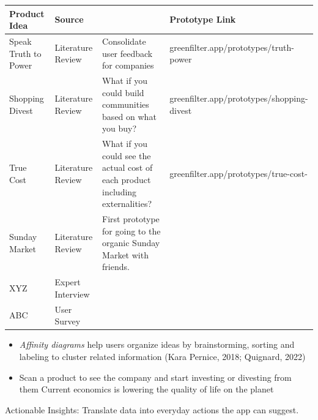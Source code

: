 \documentclass[
  letterpaper,
  DIV=11,
  numbers=noendperiod]{scrartcl}
\providecommand{\tightlist}{%
  \setlength{\itemsep}{0pt}\setlength{\parskip}{0pt}}\usepackage{longtable,booktabs,array}
\begin{document}
\begin{longtable}[]{@{}
  >{\raggedright\arraybackslash}p{}
  >{\raggedright\arraybackslash}p{}
  >{\raggedright\arraybackslash}p{}
  >{\raggedright\arraybackslash}p{}@{}}
\toprule\noalign{}
\begin{minipage}[b]{\linewidth}\raggedright
Product Idea
\end{minipage} & \begin{minipage}[b]{\linewidth}\raggedright
Source
\end{minipage} & \begin{minipage}[b]{\linewidth}\raggedright
\end{minipage} & \begin{minipage}[b]{\linewidth}\raggedright
Prototype Link
\end{minipage} \\
\midrule\noalign{}
\endhead
\bottomrule\noalign{}
\endlastfoot
Speak Truth to Power & Literature Review & Consolidate user feedback for
companies & greenfilter.app/prototypes/truth-power \\
Shopping Divest & Literature Review & What if you could build
communities based on what you buy? &
greenfilter.app/prototypes/shopping-divest \\
True Cost & Literature Review & What if you could see the actual cost of
each product including externalities? &
greenfilter.app/prototypes/true-cost- \\
Sunday Market & Literature Review & First prototype for going to the
organic Sunday Market with friends. & \\
XYZ & Expert Interview & & \\
ABC & User Survey & & \\
\end{longtable}

\begin{itemize}
\tightlist
\item
  \emph{Affinity diagrams} help users organize ideas by brainstorming,
  sorting and labeling to cluster related information (Kara Pernice,
  2018; Quignard, 2022)
\item
  Scan a product to see the company and start investing or divesting
  from them Current economics is lowering the quality of life on the
  planet
\end{itemize}

Actionable Insights: Translate data into everyday actions the app can
suggest.
\end{document}
